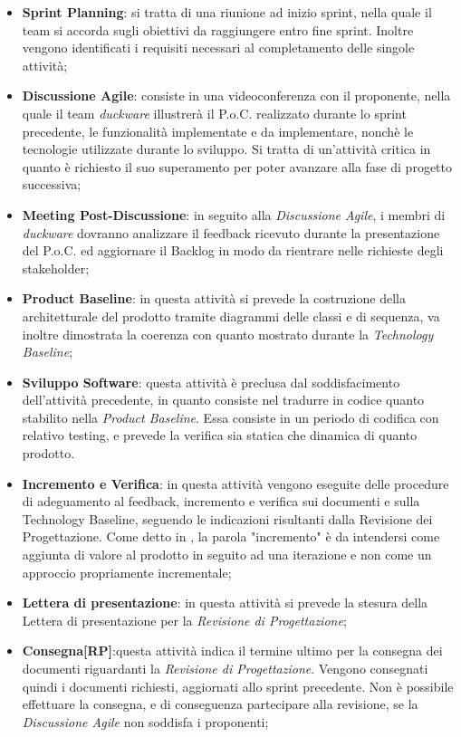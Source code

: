 	\begin{itemize}
		\item \textbf{Sprint Planning}: si tratta di una riunione ad inizio sprint, nella quale il team si accorda sugli obiettivi da raggiungere entro fine sprint. Inoltre vengono identificati i requisiti necessari al completamento delle singole attività;
		\item \textbf{Discussione Agile}: consiste in una videoconferenza con il proponente, nella quale il team \emph{duckware} illustrerà il P.o.C. realizzato durante lo sprint precedente, le funzionalità implementate e da implementare, nonchè le tecnologie utilizzate durante lo sviluppo. Si tratta di un'attività critica in quanto è richiesto il suo superamento per poter avanzare alla fase di progetto successiva;
		\item \textbf{Meeting Post-Discussione}: in seguito alla \emph{Discussione Agile}, i membri di \emph{duckware} dovranno analizzare il feedback ricevuto durante la presentazione del P.o.C. ed aggiornare il Backlog in modo da rientrare nelle richieste degli stakeholder;
		\item \textbf{Product Baseline}: in questa attività si prevede la costruzione della  architetturale del prodotto tramite diagrammi delle classi e di sequenza, va inoltre dimostrata la coerenza con quanto mostrato durante la \emph{Technology Baseline};
		\item \textbf{Sviluppo Software}: questa attività è preclusa dal soddisfacimento dell'attività precedente, in quanto consiste nel tradurre in codice quanto stabilito nella \emph{Product Baseline}. Essa consiste in un periodo di codifica con relativo testing, e prevede la verifica sia statica che dinamica di quanto prodotto.
		\item \textbf{Incremento e Verifica}: in questa attività vengono eseguite delle procedure di adeguamento al feedback, incremento e verifica sui documenti e sulla Technology Baseline, seguendo le indicazioni risultanti dalla Revisione dei Progettazione. Come detto in , la parola "incremento" è da intendersi come aggiunta di valore al prodotto in seguito ad una iterazione e non come un approccio propriamente incrementale;
		\item \textbf{Lettera di presentazione}: in questa attività si prevede la stesura della Lettera di presentazione per la \emph{Revisione di Progettazione};
		\item \textbf{Consegna[RP]}:questa attività indica il termine ultimo per la consegna dei documenti riguardanti la \emph{Revisione di Progettazione}. Vengono consegnati quindi i documenti richiesti, aggiornati allo sprint precedente. Non è possibile effettuare la consegna, e di conseguenza partecipare alla revisione, se la \emph{Discussione Agile} non soddisfa i proponenti;

\end{itemize}
